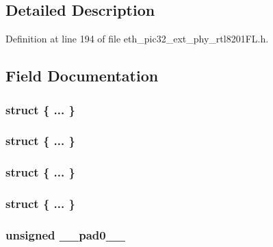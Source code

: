 \subsection{Detailed Description}


Definition at line 194 of file eth\+\_\+pic32\+\_\+ext\+\_\+phy\+\_\+rtl8201\+F\+L.\+h.



\subsection{Field Documentation}
\hypertarget{union_____a_n_l_p_a_dbits__t_aebad0609c89daba5648b238cb477d030}{}\subsubsection[{"@120}]{\setlength{\rightskip}{0pt plus 5cm}struct \{ ... \} }\label{union_____a_n_l_p_a_dbits__t_aebad0609c89daba5648b238cb477d030}
\hypertarget{union_____a_n_l_p_a_dbits__t_a60af77453e70c388042548a7f9e99d33}{}\subsubsection[{"@122}]{\setlength{\rightskip}{0pt plus 5cm}struct \{ ... \} }\label{union_____a_n_l_p_a_dbits__t_a60af77453e70c388042548a7f9e99d33}
\hypertarget{union_____a_n_l_p_a_dbits__t_ade5f1f62d46e06e8e041d784c724a098}{}\subsubsection[{"@192}]{\setlength{\rightskip}{0pt plus 5cm}struct \{ ... \} }\label{union_____a_n_l_p_a_dbits__t_ade5f1f62d46e06e8e041d784c724a098}
\hypertarget{union_____a_n_l_p_a_dbits__t_abf1a9462b53dd6be4e8f846bf31e7a1b}{}\subsubsection[{"@194}]{\setlength{\rightskip}{0pt plus 5cm}struct \{ ... \} }\label{union_____a_n_l_p_a_dbits__t_abf1a9462b53dd6be4e8f846bf31e7a1b}
\hypertarget{union_____a_n_l_p_a_dbits__t_adf71f3d8410c1f1dbbc96680a92c49af}{}
\subsubsection[{\+\_\+\+\_\+pad0\+\_\+\+\_\+}]{\setlength{\rightskip}{0pt plus 5cm}unsigned \+\_\+\+\_\+pad0\+\_\+\+\_\+}\label{union_____a_n_l_p_a_dbits__t_adf71f3d8410c1f1dbbc96680a92c49af}


